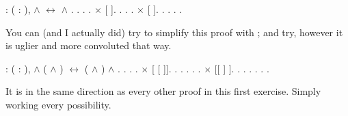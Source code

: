 \begin{coqdoccode}
\coqdocemptyline
\coqdocnoindent
{}  : \coqdockw{\ensuremath{\forall}} ( : ),  \ensuremath{\land}  \ensuremath{\leftrightarrow}  \ensuremath{\land} .\coqdoceol
\coqdocnoindent
{}.\coqdoceol
\coqdocindent{1.00em}
  . .\coqdoceol
\coqdocindent{1.00em}
\ensuremath{\times}  [ ]. .  .  .\coqdoceol
\coqdocindent{1.00em}
\ensuremath{\times}  [ ]. .  .  .\coqdoceol
\coqdocnoindent
{}.\coqdoceol
\coqdocemptyline
\end{coqdoccode}
You can (and I actually did) try to simplify this proof with ; and try, however it is uglier and more convoluted that way.

\begin{coqdoccode}
\coqdocemptyline
\coqdocnoindent
{}  : \coqdockw{\ensuremath{\forall}} (   : ),  \ensuremath{\land}  ( \ensuremath{\land} ) \ensuremath{\leftrightarrow} ( \ensuremath{\land} ) \ensuremath{\land} .\coqdoceol
\coqdocnoindent
{}.\coqdoceol
\coqdocindent{1.00em}
   . .\coqdoceol
\coqdocindent{1.00em}
\ensuremath{\times}  [ [ ]]. . .  .  .  .\coqdoceol
\coqdocindent{1.00em}
\ensuremath{\times}  [[ ] ]. .  . .  .  .\coqdoceol
\coqdocnoindent
{}.\coqdoceol
\coqdocemptyline
\end{coqdoccode}
It is in the same direction as every other proof in this first exercise. Simply working every possibility.


